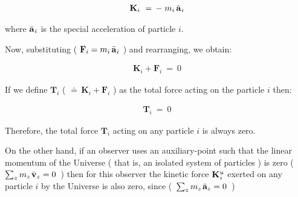 \documentclass[10pt,fleqn]{article}
\begin{document}
\begin{eqnarray*}
\mathbf{K}_i ~=\, - \; m_i \, \bar{\mathbf{a}}_{\hspace{+0.045em}i}
\end{eqnarray*}
\par \vspace{+0.60em}
\noindent where $\bar{\mathbf{a}}_{\hspace{+0.045em}i}$ is the special acceleration of particle $i$.
\par \vspace{+0.60em}
\noindent Now, substituting ( $\mathbf{F}_i = m_i \, \bar{\mathbf{a}}_{\hspace{+0.045em}i}$ ) and rearranging, we obtain:
\par \vspace{-0.75em}
\begin{eqnarray*}
\mathbf{K}_i + \mathbf{F}_i ~=~ 0
\end{eqnarray*}
\par \vspace{+0.60em}
\noindent If we define $\mathbf{T}_i$ ( $\doteq\, \mathbf{K}_i + \mathbf{F}_i$ ) as the total force acting on the particle $i$ then:
\par \vspace{-0.75em}
\begin{eqnarray*}
\mathbf{T}_i ~=~ 0
\end{eqnarray*}
\par \vspace{+0.60em}
\noindent Therefore, the total force $\mathbf{T}_i$ acting on any particle $i$ is always zero.
\par \vspace{+0.75em}
\noindent On the other hand, if an observer uses an auxiliary-point such that the linear momentum of the Universe ( that is, an isolated system of particles ) is zero {\hbox {\small ( $\sum_z m_z \hspace{+0.09em} \bar{\mathbf{v}}_z = 0$ )}} then for this observer the kinetic force $\mathbf{K}^{u}_{\hspace{+0.030em}i}$ exerted on any particle $i$ by the Universe is also zero, since {\hbox {\small ( $\sum_z m_z \hspace{+0.09em} \bar{\mathbf{a}}_z = 0$ )}}

\newpage

\par {}
\end{document}
